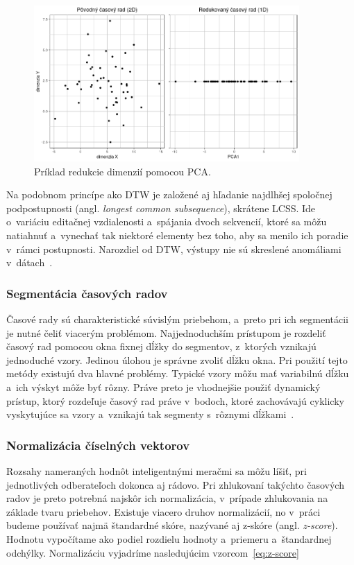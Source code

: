 \documentclass[a4paper,twoside,slovak,12pt,appendix]{article}
\begin{document}
\begin{figure}[htbp]
  \centering
  \includegraphics[width=0.9\textwidth]{pca_example.png}
  \caption{Príklad redukcie dimenzií pomocou PCA.}
  \label{fig:pca-example}
\end{figure}

Na podobnom princípe ako DTW je založené aj hľadanie najdlhšej spoločnej
podpostupnosti (angl. \textit{longest common subsequence}), skrátene LCSS. Ide
o~variáciu editačnej vzdialenosti a~spájania dvoch sekvencií, ktoré sa môžu
natiahnuť a~vynechať tak niektoré elementy bez toho, aby sa menilo ich poradie
v~rámci postupnosti. Narozdiel od DTW, výstupy nie sú skreslené anomáliami
v~dátach~\cite{Fu2011}.

\subsubsection{Segmentácia časových radov}
Časové rady sú charakteristické súvislým priebehom, a~preto pri ich segmentácii
je nutné čeliť viacerým problémom. Najjednoduchším prístupom je rozdeliť časový
rad pomocou okna fixnej dĺžky do segmentov, z~ktorých vznikajú jednoduché vzory.
Jedinou úlohou je správne zvoliť dĺžku okna. Pri použití tejto metódy existujú
dva hlavné problémy. Typické vzory môžu mať variabilnú dĺžku a~ich výskyt môže
byť rôzny. Práve preto je vhodnejšie použiť dynamický prístup, ktorý rozdeľuje
časový rad práve v~bodoch, ktoré zachovávajú cyklicky vyskytujúce sa vzory
a~vznikajú tak segmenty s~rôznymi dĺžkami~\cite{Fu2011}.

\subsubsection{Normalizácia číselných vektorov}
\label{c:z-score}
Rozsahy nameraných hodnôt inteligentnými meračmi sa môžu líšiť, pri jednotlivých
odberateľoch dokonca aj rádovo. Pri zhlukovaní takýchto časových radov je preto
potrebná najskôr ich normalizácia, v~prípade zhlukovania na základe tvaru
priebehov. Existuje viacero druhov normalizácií, no v~práci budeme používať
najmä štandardné skóre, nazývané aj z-skóre (angl. \textit{z-score}). Hodnotu
vypočítame ako podiel rozdielu hodnoty a~priemeru a~štandardnej odchýlky.
Normalizáciu vyjadríme nasledujúcim
vzorcom~\ref{eq:z-score}~\cite{Arampatzis2009}
\end{document}
